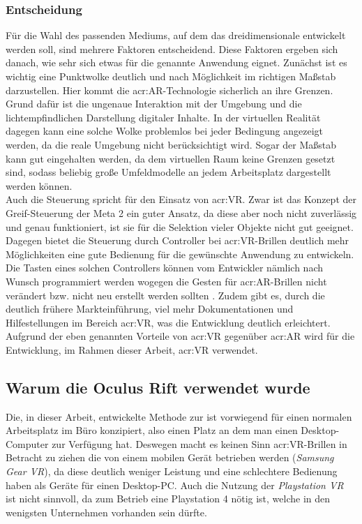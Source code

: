 \subsubsection{Entscheidung}
Für die Wahl des passenden Mediums, auf dem das dreidimensionale  entwickelt werden soll, sind mehrere Faktoren entscheidend. Diese Faktoren ergeben sich danach, wie sehr sich etwas für die genannte Anwendung eignet. Zunächst ist es wichtig eine Punktwolke deutlich und nach Möglichkeit im richtigen Maßstab darzustellen. Hier kommt die \acrlong{acr:AR}-Technologie sicherlich an ihre Grenzen. Grund dafür ist die ungenaue Interaktion mit der Umgebung und die lichtempfindlichen Darstellung digitaler Inhalte. In der virtuellen Realität dagegen kann eine solche Wolke problemlos bei jeder Bedingung angezeigt werden, da die reale Umgebung nicht berücksichtigt wird. Sogar der Maßstab kann gut eingehalten werden, da dem virtuellen Raum keine Grenzen gesetzt sind, sodass beliebig große Umfeldmodelle an jedem Arbeitsplatz dargestellt werden können.\\

Auch die Steuerung spricht für den Einsatz von \acrlong{acr:VR}. Zwar ist das Konzept der Greif-Steuerung der Meta 2 ein guter Ansatz, da diese aber noch nicht zuverlässig und genau funktioniert, ist sie für die Selektion vieler Objekte nicht gut geeignet. Dagegen bietet die Steuerung durch Controller bei \acrshort{acr:VR}-Brillen deutlich mehr Möglichkeiten eine gute Bedienung für die gewünschte Anwendung zu entwickeln. Die Tasten eines solchen Controllers können vom Entwickler nämlich nach Wunsch programmiert werden wogegen die Gesten für \acrshort{acr:AR}-Brillen nicht verändert bzw. nicht neu erstellt werden sollten \cite{bib:NewGesture}. Zudem gibt es, durch die deutlich frühere Markteinführung, viel mehr Dokumentationen und Hilfestellungen im Bereich \acrlong{acr:VR}, was die Entwicklung deutlich erleichtert.
Aufgrund der eben genannten Vorteile von \acrshort{acr:VR} gegenüber \acrshort{acr:AR} wird für die Entwicklung, im Rahmen dieser Arbeit, \acrlong{acr:VR} verwendet.\\

\subsection{Warum die Oculus Rift verwendet wurde}
\label{WhyOculus}

Die, in dieser Arbeit, entwickelte Methode zur  ist vorwiegend für einen normalen Arbeitsplatz im Büro konzipiert, also einen Platz an dem man einen Desktop-Computer zur Verfügung hat. Deswegen macht es keinen Sinn \acrshort{acr:VR}-Brillen in Betracht zu ziehen die von einem mobilen Gerät betrieben werden (\textit{Samsung Gear VR}), da diese deutlich weniger Leistung und eine schlechtere Bedienung haben als Geräte für einen Desktop-PC. Auch die Nutzung der \textit{Playstation VR} ist nicht sinnvoll, da zum Betrieb eine Playstation 4 nötig ist, welche in den wenigsten Unternehmen vorhanden sein dürfte.

